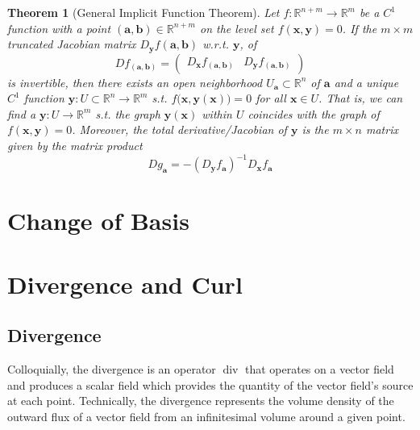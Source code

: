\documentclass{article}
\DeclareMathOperator{\Div}{div}
\newtheorem{theorem}{Theorem}[section]
\theoremstyle{remark}
\theoremstyle{definition}
\begin{document}
\begin{theorem}[General Implicit Function Theorem]
Let $f: \mathbb{R}^{n+m} \longrightarrow \mathbb{R}^m$ be a $C^1$ function with a point $(\mathbf{a}, \mathbf{b}) \in \mathbb{R}^{n + m}$ on the level set $f( \mathbf{x}, \mathbf{y}) = 0$. If the $m \times m$ truncated Jacobian matrix $D_{\mathbf{y}} f (\mathbf{a}, \mathbf{b})$ w.r.t. $\mathbf{y}$, of 
\[D f_{(\mathbf{a}, \mathbf{b})} = \begin{pmatrix} D_\mathbf{x} f_{(\mathbf{a}, \mathbf{b})} & D_\mathbf{y} f_{(\mathbf{a}, \mathbf{b})} \end{pmatrix}\]
is invertible, then there exists an open neighborhood $U_\mathbf{a} \subset \mathbb{R}^n$ of $\mathbf{a}$ and a unique $C^1$ function $\mathbf{y}: U \subset \mathbb{R}^n \longrightarrow \mathbb{R}^m$ s.t. $f\big(\mathbf{x}, \mathbf{y}(\mathbf{x}) \big) = 0$ for all $\mathbf{x} \in U$. That is, we can find a $\mathbf{y}: U \longrightarrow \mathbb{R}^m$ s.t. the graph $\mathbf{y}(\mathbf{x})$ within $U$ coincides with the graph of $f(\mathbf{x}, \mathbf{y}) = 0$. Moreover, the total derivative/Jacobian of $\mathbf{y}$ is the $m \times n$ matrix given by the matrix product 
\[D g_\mathbf{a} = - (D_\mathbf{y} f_\mathbf{a})^{-1} D_\mathbf{x} f_\mathbf{a}\]
\end{theorem}

\section{Change of Basis} 

\section{Divergence and Curl}

\subsection{Divergence}

Colloquially, the divergence is an operator $\Div$ that operates on a vector field and produces a scalar field which provides the quantity of the vector field's source at each point. Technically, the divergence represents the volume density of the outward flux of a vector field from an infinitesimal volume around a given point. 
\end{document}
